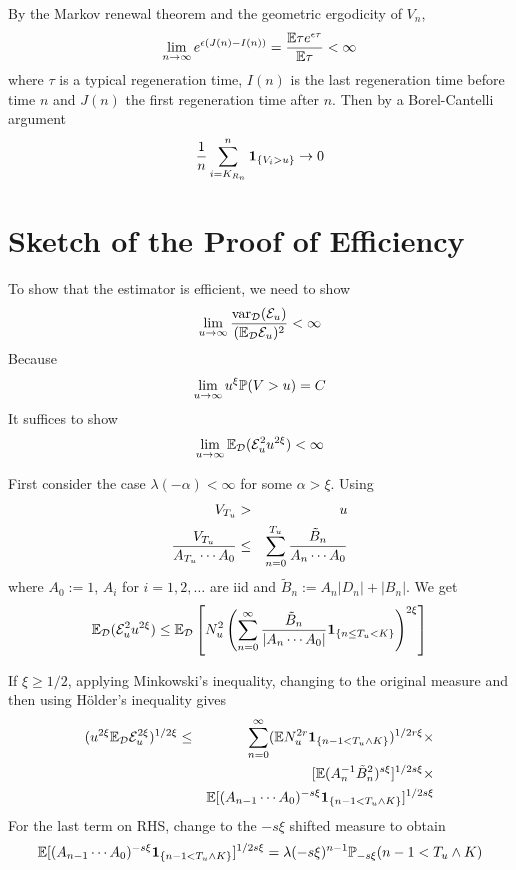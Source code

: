 \documentclass{beamer}
\begin{document}
\begin{frame}
  By the Markov renewal theorem and the geometric ergodicity of $V_n$,
  \[
  \lim_{n \to \infty} e^{\epsilon(J(n) - I(n))} = {
    \E \tau e^{\epsilon \tau}
    \over
    \E \tau
  }  < \infty
  \]
  where $\tau$ is a typical regeneration time, $I(n)$ is the last
  regeneration time before time $n$ and $J(n)$ the first regeneration
  time after $n$. Then by a Borel-Cantelli argument
  \[
  {1 \over n}\sum_{i=K_{R_n}}^n \1{V_i > u} \to 0
  \]
\end{frame}

\section{Sketch of the Proof of Efficiency}
\begin{frame}
  To show that the estimator is efficient, we need to show
  \[
  \lim_{u \to \infty} {
    \var_{\mathcal D}(\mathcal E_u)
    \over
    (\E_{\mathcal D} \mathcal E_u)^2
  } < \infty
  \]
  Because
  \[
  \lim_{u \to \infty} u^\xi \P(V > u) = C
  \]
  It suffices to show
  \[
  \lim_{u \to \infty}
    \E_{\mathcal D}(\mathcal E_u^2 u^{2\xi}) < \infty
  \]
\end{frame}

\begin{frame}
  First consider the case $\lambda(-\alpha) < \infty$ for some $\alpha
  > \xi$. Using
  \begin{eqnarray*}
    V_{T_u} &>& u \\
    {V_{T_u}
      \over
      A_{T_u} \cdots A_0
    } &\leq& \sum_{n=0}^{T_u} {
      \tilde B_n
      \over
      A_n \cdots A_0
    }
  \end{eqnarray*}
  where $A_{0} := 1$, $A_i$ for $i =1, 2, \dots$ are iid and $\tilde B_n :=
  A_n |D_n| + |B_n|$. We get
  \[
  \E_{\mathcal D}(\mathcal E_u^2 u^{2\xi}) \leq
  \E_{\mathcal D} \left[
    N_u^2
    \left(
    \sum_{n=0}^{\infty} {
      \tilde B_n
      \over
      |A_n \cdots A_0|
    }
    \1{n \leq T_u < K}
    \right)^{2\xi}
    \right]
  \]
\end{frame}

\begin{frame}
  If $\xi \geq 1/2$, applying Minkowski's inequality, changing to
  the original measure and then using H\"older's inequality gives
  \begin{eqnarray*}
    (u^{2\xi} \E_{\mathcal D} \mathcal{E}^{2\xi}_u)^{1/2\xi} &\leq&
    \sum_{n=0}^\infty
    (\E N_u^{2r} \1{n-1 < T_u \wedge K})^{1/2r\xi} \times \\
    && [\E (A_n^{-1} \tilde B_n^2)^{s\xi}]^{1/2s\xi} \times \\
    && \E[
    (A_{n-1} \cdots A_0)^{-s\xi}
    \1{n-1 < T_u \wedge K}
    ]^{1/2s\xi}
  \end{eqnarray*}
  For the last term on RHS, change to the $-s\xi$ shifted measure to
  obtain
  \[
  \E[
    (A_{n-1} \cdots A_0)^{-s\xi}
    \1{n-1 < T_u \wedge K}
    ]^{1/2s\xi} = \lambda(-s\xi)^{n-1} \P_{-s\xi}(n-1 < T_u \wedge K)
  \]
\end{frame}
\end{document}
